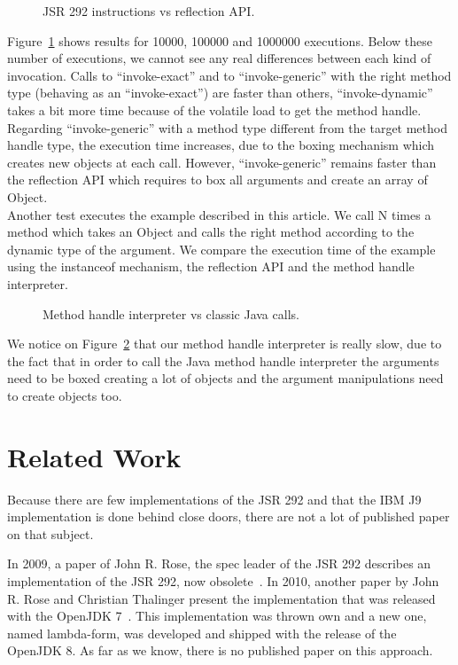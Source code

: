 \documentclass{sig-alternate}
\def \Jsr{JSR\xspace}
\def \JSR{\Jsr 292\xspace}
\begin{document}
  \begin{figure}[!ht]
    \resizebox{\linewidth}{!}{}
    \caption{JSR 292 instructions vs reflection API.}
    \label{Rinvoke}
  \end{figure}

  Figure~\ref{Rinvoke} shows results for 10000, 100000 and 1000000 executions.
  Below these number of executions, we cannot see any real differences between each kind of invocation.
  Calls to ``invoke-exact'' and to ``invoke-generic'' with the right method type (behaving as an ``invoke-exact'') are faster than others,
  ``invoke-dynamic'' takes a bit more time because of the volatile load to get the method handle.
  Regarding ``invoke-generic'' with a method type different from the target method handle type, the execution time increases,
  due to the boxing mechanism which creates new objects at each call.
  However, ``invoke-generic'' remains faster than the reflection API which requires to box all arguments and create an array of Object.\\
  
  Another test executes the example described in this article.
  We call N times a method which takes an Object and calls the right method according to the dynamic type of the argument.
  We compare the execution time of the example using the instanceof mechanism, the reflection API and the method handle interpreter.

  \begin{figure}[!ht]
    \resizebox{\linewidth}{!}{}
    \caption{Method handle interpreter vs classic Java calls.}\vspace{-1em}
    \label{Rmutable}
  \end{figure}

  We notice on Figure~\ref{Rmutable} that our method handle interpreter is really slow,
  due to the fact that in order to call the Java method handle interpreter the arguments need to be boxed creating a lot of objects
  and the argument manipulations need to create objects too.

\section{Related Work}
  Because there are few implementations of the \JSR and that the IBM J9 implementation is done behind close doors,
  there are not a lot of published paper on that subject.

  In 2009, a paper of John R. Rose, the spec leader of the \JSR describes an implementation of the \JSR,
  now obsolete~\cite{vmil-rose-indy-2009}. In 2010, another paper by John R. Rose and Christian Thalinger present the implementation
  that was released with the OpenJDK 7~\cite{pppj-rose-indy-2010}. This implementation was thrown own and a new one, named lambda-form,
  was developed and shipped with the release of the OpenJDK 8. As far as we know, there is no published paper on this approach.
\end{document}

